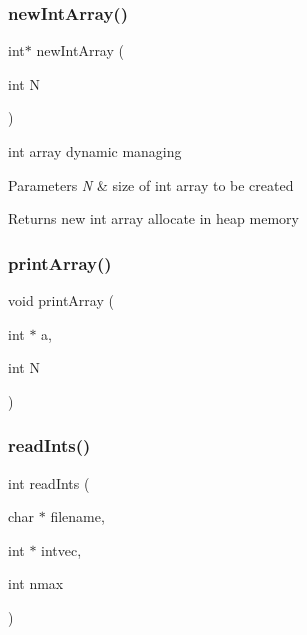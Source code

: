 \subsubsection{new\+Int\+Array()}
{\footnotesize\ttfamily int$\ast$ new\+Int\+Array (\begin{DoxyParamCaption}\item[{int}]{N }\end{DoxyParamCaption})}



int array dynamic managing 


\begin{DoxyParams}{Parameters}
{\em N} & size of int array to be created\\
\hline
\end{DoxyParams}
\begin{DoxyReturn}{Returns}
new int array allocate in heap memory 
\end{DoxyReturn}
\label{lib__util_8h_a111139000f3b4b6c6279a767613bd1ea} 
\subsubsection{print\+Array()}
{\footnotesize\ttfamily void print\+Array (\begin{DoxyParamCaption}\item[{int $\ast$}]{a,  }\item[{int}]{N }\end{DoxyParamCaption})}

\label{lib__util_8h_a8b7139ad6768a94ed9ef3c1658dbc0f0} 
\subsubsection{read\+Ints()}
{\footnotesize\ttfamily int read\+Ints (\begin{DoxyParamCaption}\item[{char $\ast$}]{filename,  }\item[{int $\ast$}]{intvec,  }\item[{int}]{nmax }\end{DoxyParamCaption})}

\label{lib__util_8h_a341dc1557d8a77725b8a75cfe55d0d9c} 
